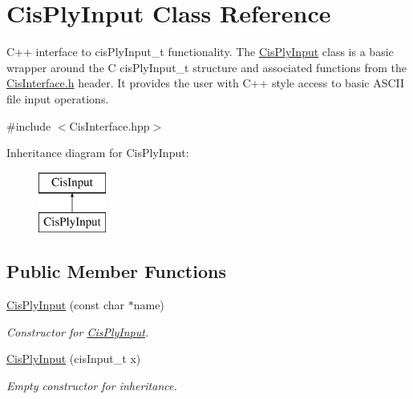 \hypertarget{classCisPlyInput}{}\section{Cis\+Ply\+Input Class Reference}
\label{classCisPlyInput}


C++ interface to cis\+Ply\+Input\+\_\+t functionality. The \mbox{\hyperlink{classCisPlyInput}{Cis\+Ply\+Input}} class is a basic wrapper around the C cis\+Ply\+Input\+\_\+t structure and associated functions from the \mbox{\hyperlink{CisInterface_8h_source}{Cis\+Interface.\+h}} header. It provides the user with C++ style access to basic A\+S\+C\+II file input operations.  




{\ttfamily \#include $<$Cis\+Interface.\+hpp$>$}

Inheritance diagram for Cis\+Ply\+Input\+:\begin{figure}[H]
\begin{center}
\leavevmode
\includegraphics[height=2.000000cm]{classCisPlyInput}
\end{center}
\end{figure}
\subsection*{Public Member Functions}
\begin{DoxyCompactItemize}
\item 
\mbox{\hyperlink{classCisPlyInput_aedfc1d48a88199c0eb7b318f423b61c5}{Cis\+Ply\+Input}} (const char $\ast$name)
\begin{DoxyCompactList}\small\item\em Constructor for \mbox{\hyperlink{classCisPlyInput}{Cis\+Ply\+Input}}. \end{DoxyCompactList}\item 
\mbox{\label{classCisPlyInput_ae44397567fdba765a43aba31af169fd0}} 
\mbox{\hyperlink{classCisPlyInput_ae44397567fdba765a43aba31af169fd0}{Cis\+Ply\+Input}} (cis\+Input\+\_\+t x)
\begin{DoxyCompactList}\small\item\em Empty constructor for inheritance. \end{DoxyCompactList}\end{DoxyCompactItemize}


